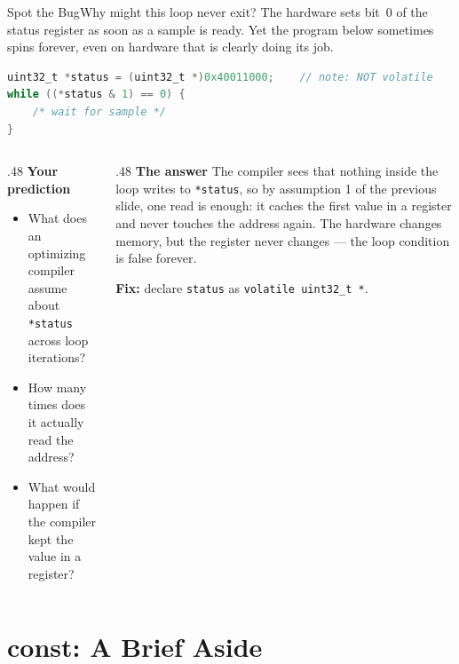 \documentclass[9pt,aspectratio=169,xcolor=table]{beamer}
\begin{document}
{\beamerextras
\begin{frame}[fragile]{Spot the Bug}{Why might this loop never exit?}
    \leavevmode
    The hardware sets bit~0 of the status register as soon as a sample is
    ready. Yet the program below sometimes spins forever, even on
    hardware that is clearly doing its job.

    \vspace{3mm}
\begin{lstlisting}[language=C, basicstyle=\ttfamily\footnotesize]
uint32_t *status = (uint32_t *)0x40011000;    // note: NOT volatile
while ((*status & 1) == 0) {
    /* wait for sample */
}
\end{lstlisting}

    \vspace{3mm}
    \begin{columns}[T]
    \begin{column}{.48\textwidth}
        \textbf{Your prediction}
        {\small
        \begin{itemize}\itemsep1pt
            \item What does an optimizing compiler assume about \texttt{*status} across loop iterations?
            \item How many times does it actually read the address?
            \item What would happen if the compiler kept the value in a register?
        \end{itemize}}
    \end{column}
    \begin{column}{.48\textwidth}
        \textbf{The answer}
        {\small The compiler sees that nothing inside the loop writes to \texttt{*status}, so by assumption 1 of the previous slide, one read is enough: it \alert{caches the first value in a register} and never touches the address again. The hardware changes memory, but the register never changes --- the loop condition is false forever.}

        \vspace{1mm}
        {\small \textbf{Fix:} declare \texttt{status} as \texttt{volatile uint32\_t *}.}
    \end{column}
    \end{columns}
\end{frame}
}


\section{const: A Brief Aside}
\end{document}
